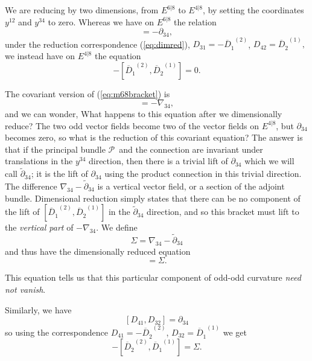 \documentclass[twoside]{amsart}
\renewcommand{\eqref}[1]{(\ref{eq:#1})}
\newcommand{\enm}[1]{\ensuremath{#1}}
\newcommand{\superijk}[3]{\enm{{#1}^{#2|#3}}}
\newcommand{\rrij}[2]{\superijk{E}{#1}{#2}}
\renewcommand{\bar}[1]{\overline{#1}}
\newcommand{\di}[1]{\enm{\partial_{#1}}}
\newcommand{\ditil}[1]{\enm{\tilde{\partial}_{#1}}}
\newcommand{\cjsub}[2]{\enm{\bar#1{} _{{\dot{#2 }}}}} %
\newcommand{\odi}[1]{\enm{D_{#1}}}
\newcommand{\odicj}[1]{\enm{\cjsub{D}{#1}}}
\newcommand{\onetwoij}[2]{\enm{#1^{(#2)}}}
\newcommand{\pp}{\enm{\mathcal{P}}}
\newcommand{\dicov}[1]{\enm{\nabla_{#1}}}
\newcommand{\odicov}[1]{\enm{\mathcal{D}_{#1}}}
\newcommand{\odicjcov}[1]{\enm{\bar{\mathcal{D}}_{\dot{#1}}}}
\begin{document}
We are reducing by two
dimensions, from \rrij{6}{8} to \rrij{4}{8}, by setting the
coordinates \( y^{12} \) and \( y^{34} \) to zero.  Whereas we have
on \rrij{6}{8} the relation
\begin{equation}
     [\odi{31}, \odi{42}]=-\di{34},
    \label{eq:m68bracket}
\end{equation}
under the reduction correspondence \eqref{dimred}, \( \odi{31} =
-\onetwoij{\odicj{1}}{2} \), \( \odi{42} = \onetwoij{\odicj{2}}{1}, \)
we instead have on \rrij{4}{8} the equation
\begin{equation}
    -[\onetwoij{\odicj{1}}{2}, \onetwoij{\odicj{2}}{1}] = 0.
    \label{eq:m48bracket}
\end{equation}

The covariant version of \eqref{m68bracket} is
\begin{equation}
     [\odicov{31}, \odicov{42}]=-\dicov{34},
    \label{eq:m68bracketcov}
\end{equation}
and we can wonder, What happens to this equation after we
dimensionally reduce?  The two odd vector fields become two of the
vector fields on \rrij{4}{8}, but \di{34} becomes zero, so what is the
reduction of this covariant equation?  The answer is that if the
principal bundle \pp\ and the connection are invariant under
translations in the \( y^{34} \) direction, then there is a trivial
lift of \( \di{34} \) which we will call \ditil{34}; it is the lift of
\di{34} using the product connection in this trivial direction.  The
difference \( \dicov{34} - \ditil{34} \) is a vertical vector field,
or a section of the adjoint bundle.  Dimensional reduction simply
states that there can be no component of the lift of \(
[\onetwoij{\odicj{1}}{2}, \onetwoij{\odicj{2}}{1}] \) in the
\ditil{34} direction, and so this bracket must lift to the
\emph{vertical part} of \( -\dicov{34} \).  We define
\[ \Sigma =%
\dicov{34} - \ditil{34} \] and thus have the
dimensionally reduced equation
\begin{equation}
    [\onetwoij{\odicjcov{1}}{2}, \onetwoij{\odicjcov{2}}{1}] =
    \Sigma.
    \label{eq:sigma1}
\end{equation}

This equation tells us that this particular component of odd-odd
curvature \emph{need not vanish}.

Similarly, we have
\[ [\odi{41}, \odi{32}] = \di{34} \]
so using the correspondence \( \odi{41} = -\onetwoij{\odicj{2}}{2}
\),
\( \odi{32} = \onetwoij{\odicj{1}}{1}  \) we get
\begin{equation}
    -[\onetwoij{\odicj{2}}{2}, \onetwoij{\odicj{1}}{1}] = \Sigma.
    \label{eq:sigma2}
\end{equation}
\end{document}

